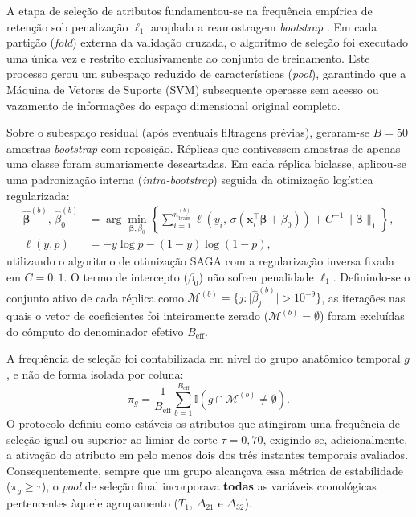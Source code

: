 \documentclass[review]{elsarticle}
\begin{document}
A etapa de seleção de atributos fundamentou-se na frequência empírica de retenção sob penalização $\ell_1$ acoplada a reamostragem \emph{bootstrap} \citep{bach-2008,meinshausen-2010}. Em cada partição (\emph{fold}) externa da validação cruzada, o algoritmo de seleção foi executado uma única vez e restrito exclusivamente ao conjunto de treinamento. Este processo gerou um subespaço reduzido de características (\emph{pool}), garantindo que a Máquina de Vetores de Suporte (SVM) subsequente operasse sem acesso ou vazamento de informações do espaço dimensional original completo.

Sobre o subespaço residual (após eventuais filtragens prévias), geraram-se $B=50$ amostras \emph{bootstrap} com reposição. Réplicas que contivessem amostras de apenas uma classe foram sumariamente descartadas. Em cada réplica biclasse, aplicou-se uma padronização interna (\emph{intra-bootstrap}) seguida da otimização logística regularizada:
\begin{equation}
	\begin{aligned}
		\hat{\boldsymbol{\beta}}^{(b)},\,\hat{\beta}_0^{(b)}
		&= \arg\min_{\boldsymbol{\beta},\beta_0}
		\left\{
		\sum_{i=1}^{n_{\mathrm{train}}^{(b)}}
		\ell\!\left(y_i,\,\sigma(\mathbf{x}_i^{\top}\boldsymbol{\beta}+\beta_0)\right)
		+ C^{-1}\|\boldsymbol{\beta}\|_1
		\right\}, \\
		\ell(y,p) &= -y\log p-(1-y)\log(1-p),
	\end{aligned}
	\label{eq:l1-logistic}
\end{equation}
utilizando o algoritmo de otimização SAGA com a regularização inversa fixada em $C=0{,}1$. O termo de intercepto ($\beta_0$) não sofreu penalidade $\ell_1$. Definindo-se o conjunto ativo de cada réplica como $\mathcal{M}^{(b)} = \{j : \lvert\hat{\beta}^{(b)}_j\rvert > 10^{-9}\}$, as iterações nas quais o vetor de coeficientes foi inteiramente zerado ($\mathcal{M}^{(b)} = \emptyset$) foram excluídas do cômputo do denominador efetivo $B_{\mathrm{eff}}$.

A frequência de seleção foi contabilizada em nível do grupo anatômico temporal $g$, e não de forma isolada por coluna:
\begin{equation}
	\pi_g = \frac{1}{B_{\mathrm{eff}}}\sum_{b=1}^{B_{\mathrm{eff}}} \mathbb{I}\!\left(g\cap\mathcal{M}^{(b)}\ne\emptyset\right).
	\label{eq:stability-freq}
\end{equation}
O protocolo definiu como estáveis os atributos que atingiram uma frequência de seleção igual ou superior ao limiar de corte $\tau=0{,}70$, exigindo-se, adicionalmente, a ativação do atributo em pelo menos dois dos três instantes temporais avaliados. Consequentemente, sempre que um grupo alcançava essa métrica de estabilidade ($\pi_g \ge \tau$), o \emph{pool} de seleção final incorporava \textbf{todas} as variáveis cronológicas pertencentes àquele agrupamento ($T_1$, $\Delta_{21}$ e $\Delta_{32}$).
\end{document}
